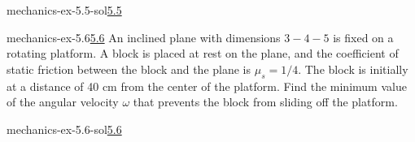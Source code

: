 \documentclass[preview]{standalone}
\begin{document}
\begin{snippetsolution}{mechanics-ex-5.5-sol}{\underline{5.5}}
    \todo
\end{snippetsolution}

\begin{snippetexercise}{mechanics-ex-5.6}{\underline{5.6}}
    An inclined plane with dimensions \( 3-4-5 \) is fixed on a rotating platform. A block is placed at rest on the plane, and the coefficient of static friction between the block and the plane is \( \mu_s = 1/4 \). The block is initially at a distance of 40 cm from the center of the platform. Find the minimum value of the angular velocity \( \omega \) that prevents the block from sliding off the platform.
\end{snippetexercise}

\begin{snippetsolution}{mechanics-ex-5.6-sol}{\underline{5.6}}
    \todo
\end{snippetsolution}
\end{document}
